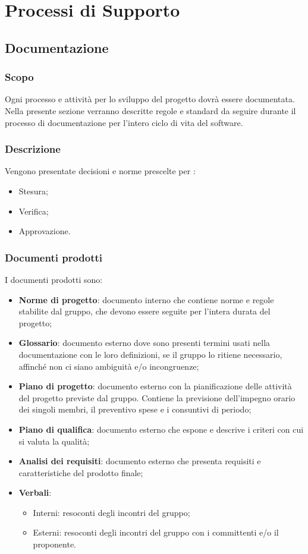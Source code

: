 \section{Processi di Supporto}
\subsection{Documentazione}
\subsubsection{Scopo}
Ogni processo e attività per lo sviluppo del progetto dovrà essere documentata. Nella presente sezione verranno descritte regole e standard da seguire durante il processo di documentazione per l’intero ciclo di vita del software.

\subsubsection{Descrizione}
Vengono presentate decisioni e norme prescelte per :
\begin{itemize}
  \item Stesura;
  \item Verifica;
  \item Approvazione.
\end{itemize}

\subsubsection{Documenti prodotti}
I documenti prodotti sono:
\begin{itemize}
  \item \textbf{Norme di progetto}: documento interno che contiene norme e regole stabilite dal gruppo, che devono essere seguite per l’intera durata del progetto;
  \item \textbf{Glossario}: documento esterno dove sono presenti termini usati nella documentazione con le loro definizioni, se il gruppo lo ritiene necessario, affinché non ci siano ambiguità e/o incongruenze;
  \item \textbf{Piano di progetto}: documento esterno con la pianificazione delle attività del progetto previste dal gruppo. Contiene la previsione dell’impegno orario dei singoli membri, il preventivo spese e i consuntivi di periodo;
  \item \textbf{Piano di qualifica}: documento esterno che espone e descrive i criteri con cui si valuta la qualità;
  \item \textbf{Analisi dei requisiti}: documento esterno che presenta requisiti e caratteristiche del prodotto finale;
  \item \textbf{Verbali}:
  \begin{itemize}
  		\item Interni: resoconti degli incontri del gruppo;
  		\item Esterni: resoconti degli incontri del gruppo con i committenti e/o il proponente.
	\end{itemize}
\end{itemize}

